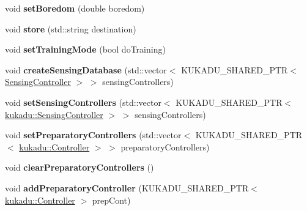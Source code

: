 \begin{DoxyCompactItemize}
\item 
\hypertarget{classkukadu_1_1ComplexController_ae04169f9dcb3970089bb44c8905bcdc4}{void {\bfseries set\-Boredom} (double boredom)}\label{classkukadu_1_1ComplexController_ae04169f9dcb3970089bb44c8905bcdc4}

\item 
\hypertarget{classkukadu_1_1ComplexController_a921fd27f700ee3ff2611546b63f23100}{void {\bfseries store} (std\-::string destination)}\label{classkukadu_1_1ComplexController_a921fd27f700ee3ff2611546b63f23100}

\item 
\hypertarget{classkukadu_1_1ComplexController_a5a0486739a34120b94901f4893fdf8d0}{void {\bfseries set\-Training\-Mode} (bool do\-Training)}\label{classkukadu_1_1ComplexController_a5a0486739a34120b94901f4893fdf8d0}

\item 
\hypertarget{classkukadu_1_1ComplexController_a1481c37be379f4dc717740c6f2bf74a3}{void {\bfseries create\-Sensing\-Database} (std\-::vector$<$ K\-U\-K\-A\-D\-U\-\_\-\-S\-H\-A\-R\-E\-D\-\_\-\-P\-T\-R$<$ \hyperlink{classkukadu_1_1SensingController}{Sensing\-Controller} $>$ $>$ sensing\-Controllers)}\label{classkukadu_1_1ComplexController_a1481c37be379f4dc717740c6f2bf74a3}

\item 
\hypertarget{classkukadu_1_1ComplexController_a43f98dafcffca0e3d437a3dca761ddaf}{void {\bfseries set\-Sensing\-Controllers} (std\-::vector$<$ K\-U\-K\-A\-D\-U\-\_\-\-S\-H\-A\-R\-E\-D\-\_\-\-P\-T\-R$<$ \hyperlink{classkukadu_1_1SensingController}{kukadu\-::\-Sensing\-Controller} $>$ $>$ sensing\-Controllers)}\label{classkukadu_1_1ComplexController_a43f98dafcffca0e3d437a3dca761ddaf}

\item 
\hypertarget{classkukadu_1_1ComplexController_a3221ce22a7472721add0a585e4de12b8}{void {\bfseries set\-Preparatory\-Controllers} (std\-::vector$<$ K\-U\-K\-A\-D\-U\-\_\-\-S\-H\-A\-R\-E\-D\-\_\-\-P\-T\-R$<$ \hyperlink{classkukadu_1_1Controller}{kukadu\-::\-Controller} $>$ $>$ preparatory\-Controllers)}\label{classkukadu_1_1ComplexController_a3221ce22a7472721add0a585e4de12b8}

\item 
\hypertarget{classkukadu_1_1ComplexController_a5c9e2b9e0e9eb58eef8a8b9eceebcb7f}{void {\bfseries clear\-Preparatory\-Controllers} ()}\label{classkukadu_1_1ComplexController_a5c9e2b9e0e9eb58eef8a8b9eceebcb7f}

\item 
\hypertarget{classkukadu_1_1ComplexController_ad432f3b834ecbaba5b47604a695705a6}{void {\bfseries add\-Preparatory\-Controller} (K\-U\-K\-A\-D\-U\-\_\-\-S\-H\-A\-R\-E\-D\-\_\-\-P\-T\-R$<$ \hyperlink{classkukadu_1_1Controller}{kukadu\-::\-Controller} $>$ prep\-Cont)}\label{classkukadu_1_1ComplexController_ad432f3b834ecbaba5b47604a695705a6}


\end{DoxyCompactItemize}

